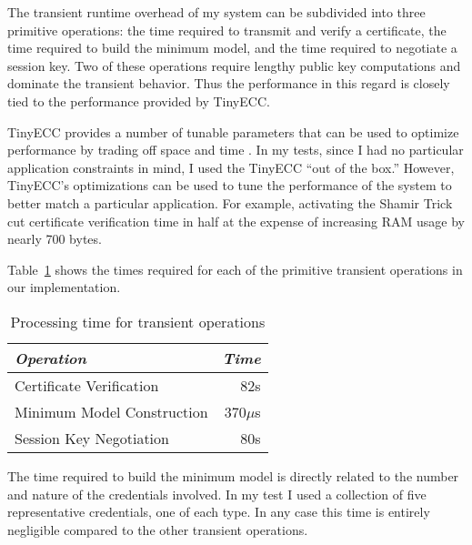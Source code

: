 The transient runtime overhead of my system can be subdivided into three primitive operations:
the time required to transmit and verify a certificate, the time required to build the minimum
model, and the time required to negotiate a session key. Two of these operations require lengthy
public key computations and dominate the transient behavior. Thus the performance in this regard
is closely tied to the performance provided by TinyECC.

TinyECC provides a number of tunable parameters that can be used to optimize performance by
trading off space and time \cite{Liu-Peng-TinyECC-2008}. In my tests, since I had no particular
application constraints in mind, I used the TinyECC ``out of the box.'' However, TinyECC's
optimizations can be used to tune the performance of the system to better match a particular
application. For example, activating the Shamir Trick cut certificate verification time in half
at the expense of increasing RAM usage by nearly 700 bytes.

Table~\ref{table-transient-time} shows the times required for each of the primitive transient
operations in our implementation.

\begin{table}[tbhp]
  \newcommand\T{\rule{0pt}{2.1ex}}
  \centering
  \caption{Processing time for transient operations}
  {
  \begin{tabular}{|l|r|} \hline
    \textit{Operation} \T & \textit{Time} \\ \hline \hline

    Certificate Verification     \T &  82s \\ \hline 
    Minimum Model Construction   \T & 370$\mu$s \\ \hline
    Session Key Negotiation      \T &  80s\\ \hline
  \end{tabular}
  }
  \label{table-transient-time}
\end{table}

The time required to build the minimum model is directly related to the number and nature of the
credentials involved. In my test I used a collection of five representative credentials, one of
each type. In any case this time is entirely negligible compared to the other transient
operations.



